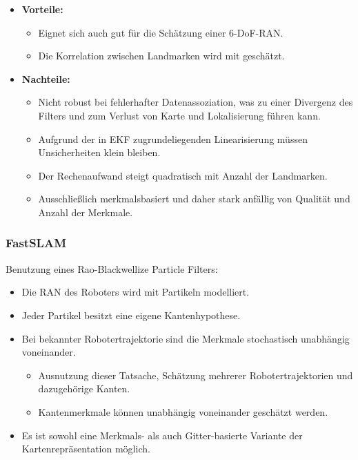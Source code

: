 				\begin{itemize}
					\item \textbf{Vorteile:}
						\begin{itemize}
							\item Eignet sich auch gut für die Schätzung einer 6-DoF-RAN.
							\item Die Korrelation zwischen Landmarken wird mit geschätzt.
						\end{itemize}
					\item \textbf{Nachteile:}
						\begin{itemize}
							\item Nicht robust bei fehlerhafter Datenassoziation, was zu einer Divergenz des Filters und zum Verlust von Karte und Lokalisierung führen kann.
							\item Aufgrund der in EKF zugrundeliegenden Linearisierung müssen Unsicherheiten klein bleiben.
							\item Der Rechenaufwand steigt quadratisch mit Anzahl der Landmarken.
							\item Ausschließlich merkmalsbasiert und daher stark anfällig von Qualität und Anzahl der Merkmale.
						\end{itemize}
				\end{itemize}

			\subsubsection{FastSLAM}
				Benutzung eines Rao-Blackwellize Particle Filters:
				\begin{itemize}
					\item Die RAN des Roboters wird mit Partikeln modelliert.
					\item Jeder Partikel besitzt eine eigene Kantenhypothese.
					\item Bei bekannter Robotertrajektorie sind die Merkmale stochastisch unabhängig voneinander.
						\begin{itemize}
							\item Ausnutzung dieser Tatsache, Schätzung mehrerer Robotertrajektorien und dazugehörige Kanten.
							\item Kantenmerkmale können unabhängig voneinander geschätzt werden.
						\end{itemize}
					\item Es ist sowohl eine Merkmals- als auch Gitter-basierte Variante der Kartenrepräsentation möglich.
				\end{itemize}
			
